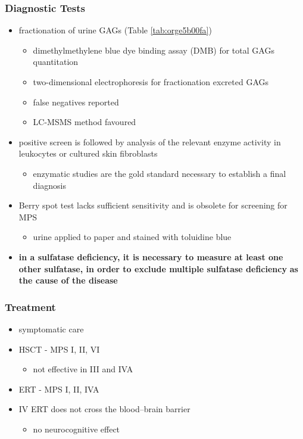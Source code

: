 \documentclass[12pt]{scrartcl}
\begin{document}
\subsubsection{Diagnostic Tests}
\label{sec:org5df1afe}
\begin{itemize}
\item fractionation of urine GAGs (Table \ref{tab:orge5b00fa})
\begin{itemize}
\item dimethylmethylene blue dye binding assay (DMB) for total GAGs
quantitation
\item two-dimensional electrophoresis for fractionation excreted GAGs
\item false negatives reported
\item LC-MSMS method favoured
\end{itemize}
\item positive screen is followed by analysis of the relevant enzyme
activity in leukocytes or cultured skin fibroblasts
\begin{itemize}
\item enzymatic studies are the gold standard necessary to establish a
final diagnosis
\end{itemize}
\item Berry spot test lacks sufficient sensitivity and is obsolete for
screening for MPS
\begin{itemize}
\item urine applied to paper and stained with toluidine blue
\end{itemize}
\item \textbf{in a sulfatase deficiency, it is necessary to measure at least one}
\textbf{other sulfatase, in order to exclude multiple sulfatase deficiency}
\textbf{as the cause of the disease}
\end{itemize}

\subsubsection{Treatment}
\label{sec:org0cfc3e0}
\begin{itemize}
\item symptomatic care
\item HSCT - MPS I, II, VI
\begin{itemize}
\item not effective in III and IVA
\end{itemize}
\item ERT - MPS I, II, IVA
\item IV ERT does not cross the blood–brain barrier
\begin{itemize}
\item no neurocognitive effect
\end{itemize}
\end{itemize}
\end{document}
